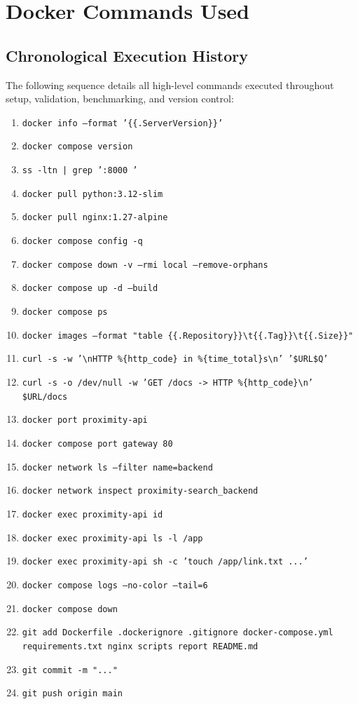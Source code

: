 \documentclass[10pt,a4paper]{article}
\begin{document}
\section{Docker Commands Used}

\subsection{Chronological Execution History}
The following sequence details all high-level commands executed throughout setup, validation, benchmarking, and version control:
\begin{enumerate}
    \setlength\itemsep{0em}
    \item \texttt{docker info --format '\{\{.ServerVersion\}\}'}
    \item \texttt{docker compose version}
    \item \texttt{ss -ltn | grep ':8000 '}
    \item \texttt{docker pull python:3.12-slim}
    \item \texttt{docker pull nginx:1.27-alpine}
    \item \texttt{docker compose config -q}
    \item \texttt{docker compose down -v --rmi local --remove-orphans}
    \item \texttt{docker compose up -d --build}
    \item \texttt{docker compose ps}
    \item \texttt{docker images --format "table \{\{.Repository\}\}\textbackslash t\{\{.Tag\}\}\textbackslash t\{\{.Size\}\}"}
    \item \texttt{curl -s -w '\textbackslash nHTTP \%\{http\_code\} in \%\{time\_total\}s\textbackslash n' '\$URL\$Q'}
    \item \texttt{curl -s -o /dev/null -w 'GET /docs -> HTTP \%\{http\_code\}\textbackslash n' \$URL/docs}
    \item \texttt{docker port proximity-api}
    \item \texttt{docker compose port gateway 80}
    \item \texttt{docker network ls --filter name=backend}
    \item \texttt{docker network inspect proximity-search\_backend}
    \item \texttt{docker exec proximity-api id}
    \item \texttt{docker exec proximity-api ls -l /app}
    \item \texttt{docker exec proximity-api sh -c 'touch /app/link.txt ...'}
    \item \texttt{docker compose logs --no-color --tail=6}
    \item \texttt{docker compose down}
    \item \texttt{git add Dockerfile .dockerignore .gitignore docker-compose.yml requirements.txt nginx scripts report README.md}
    \item \texttt{git commit -m "..."}
    \item \texttt{git push origin main}
\end{enumerate}
\end{document}
